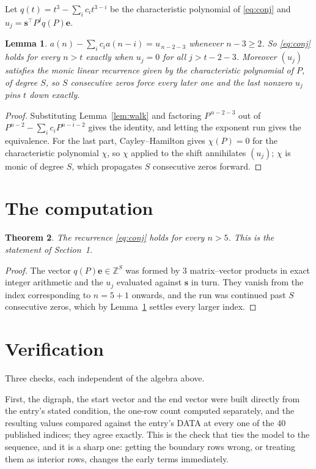 \documentclass[11pt,a4paper]{article}
\theoremstyle{plain}
\newtheorem{theorem}{Theorem}
\newtheorem{lemma}[theorem]{Lemma}
\theoremstyle{definition}
\begin{document}
Let $q(t)=t^{3}-\sum_i c_i t^{3-i}$ be the characteristic polynomial of
\eqref{eq:conj} and $u_j=\mathbf{s}^{\!\top}P^{j}q(P)\mathbf{e}$.

\begin{lemma}\label{lem:crit}
$a(n)-\sum_i c_i a(n-i)=u_{\,n-2-3}$ whenever $n-3\ge2$. So \eqref{eq:conj}
holds for every $n>t$ exactly when $u_j=0$ for all $j>t-2-3$. Moreover $(u_j)$
satisfies the monic linear recurrence given by the characteristic polynomial of $P$, of
degree $S$, so $S$ consecutive zeros force every later one and the last nonzero $u_j$ pins
$t$ down exactly.
\end{lemma}

\begin{proof}
Substituting Lemma~\ref{lem:walk} and factoring $P^{\,n-2-3}$ out of
$P^{n-2}-\sum_i c_i P^{n-i-2}$ gives the identity, and letting the exponent run gives the
equivalence. For the last part, Cayley--Hamilton gives $\chi(P)=0$ for the characteristic
polynomial $\chi$, so $\chi$ applied to the shift annihilates $(u_j)$; $\chi$ is monic of
degree $S$, which propagates $S$ consecutive zeros forward.
\end{proof}

\section{The computation}

\begin{theorem}
The recurrence \eqref{eq:conj} holds for every $n>5$. This is the statement of
Section~1.
\end{theorem}

\begin{proof}
The vector $q(P)\mathbf{e}\in\mathbb{Z}^{S}$ was formed by $3$ matrix--vector
products in exact integer arithmetic and the $u_j$ evaluated against $\mathbf{s}$ in turn.
They vanish from the index corresponding to $n=5+1$ onwards, and the run was continued
past $S$ consecutive zeros, which by Lemma~\ref{lem:crit} settles every larger index.
\end{proof}

\section{Verification}

Three checks, each independent of the algebra above.

First, the digraph, the start vector and the end vector were built directly from the
entry's stated condition, the one-row count computed separately, and the resulting values
compared against the entry's DATA at every one of the $40$ published indices; they
agree exactly. This is the check that ties the model to the sequence, and it is a sharp one:
getting the boundary rows wrong, or treating them as interior rows, changes the early terms
immediately.
\end{document}
